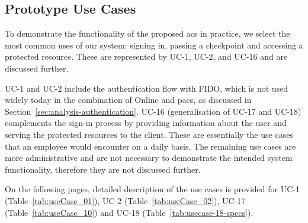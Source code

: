 \subsection{Prototype Use Cases} \label{sec:design-prototype-usecases}
To demonstrate the functionality of the proposed \acrshort{acs} in practice, we select the most common uses of our system: signing in, passing a checkpoint and accessing a protected resource. These are represented by UC-1, UC-2, and UC-16 and are discussed further.

UC-1 and UC-2 include the authentication flow with FIDO, which is not used widely today in the combination of Online and \acrlong{pacs}, as discussed in Section~\ref{sec:analysis-authentication}. UC-16 (generalisation of UC-17 and UC-18) complements the sign-in process by providing information about the user and serving the protected resources to the client. These are essentially the use cases that an employee would encounter on a daily basis. The remaining use cases are more administrative and are not necessary to demonstrate the intended system functionality, therefore they are not discussed further.

On the following pages, detailed description of the use cases is provided for UC-1 (Table~\ref{tab:useCase_01}), UC-2 (Table~\ref{tab:useCase_02}), UC-17 (Table~\ref{tab:useCase_10}) and UC-18 (Table~\ref{tab:usecase-18-specs}).


\restoregeometry